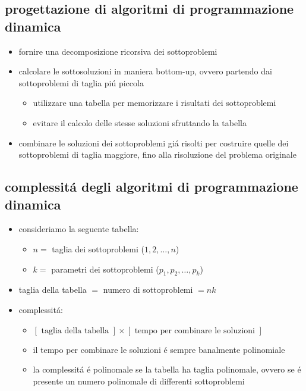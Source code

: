 \subsection*{progettazione di algoritmi di programmazione dinamica}
\begin{flushleft}
	\begin{itemize}
		\item fornire una decomposizione ricorsiva dei sottoproblemi
		\item calcolare le sottosoluzioni in maniera bottom-up, ovvero partendo dai sottoproblemi di taglia pi\'u piccola
		\begin{itemize}
			\item utilizzare una tabella per memorizzare i risultati dei sottoproblemi
			\item evitare il calcolo delle stesse soluzioni sfruttando la tabella
		\end{itemize}
		\item combinare le soluzioni dei sottoproblemi gi\'a risolti per costruire quelle dei sottoproblemi di taglia maggiore, fino alla risoluzione del problema originale
	\end{itemize}
\end{flushleft}


\subsection*{complessit\'a degli algoritmi di programmazione dinamica}
\begin{flushleft}
	\begin{itemize}
		\item consideriamo la seguente tabella:
		\begin{itemize}
			\item $n=$ taglia dei sottoproblemi ($1,2,\ldots,n$)
			\item $k=$ parametri dei sottoproblemi ($p_1,p_2,\ldots,p_k$)
		\end{itemize}
		\item taglia della tabella $=$ numero di sottoproblemi $=nk$
		\item complessit\'a:
		\begin{itemize}
			\item $[\text{ taglia della tabella }]\times[\text{ tempo per combinare le soluzioni }]$
			\item il tempo per combinare le soluzioni \'e sempre banalmente polinomiale
			\item la complessit\'a \'e polinomale se la tabella ha taglia polinomale, ovvero se \'e presente un numero polinomale di differenti sottoproblemi
		\end{itemize}
	\end{itemize}
\end{flushleft}

